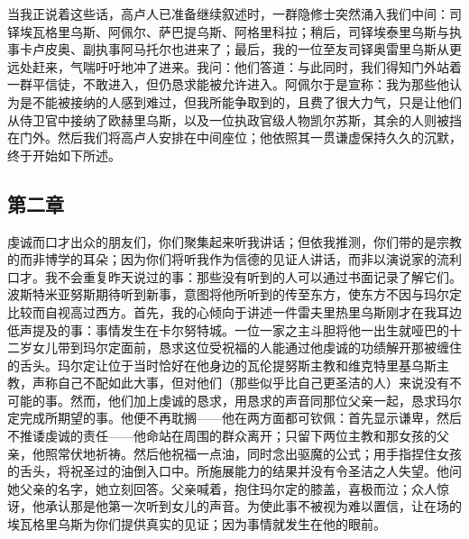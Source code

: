 当我正说着这些话，高卢人已准备继续叙述时，一群隐修士突然涌入我们中间：司铎埃瓦格里乌斯、阿佩尔、萨巴提乌斯、阿格里科拉；稍后，司铎埃泰里乌斯与执事卡卢皮奥、副执事阿马托尔也进来了；最后，我的一位至友司铎奥雷里乌斯从更远处赶来，气喘吁吁地冲了进来。我问：他们答道：与此同时，我们得知门外站着一群平信徒，不敢进入，但仍恳求能被允许进入。阿佩尔于是宣称：我为那些他认为是不能被接纳的人感到难过，但我所能争取到的，且费了很大力气，只是让他们从侍卫官中接纳了欧赫里乌斯，以及一位执政官级人物凯尔苏斯，其余的人则被挡在门外。然后我们将高卢人安排在中间座位；他依照其一贯谦虚保持久久的沉默，终于开始如下所述。\par


\subsection{第二章}

虔诚而口才出众的朋友们，你们聚集起来听我讲话；但依我推测，你们带的是宗教的而非博学的耳朵；因为你们将听我作为信德的见证人讲话，而非以演说家的流利口才。我不会重复昨天说过的事：那些没有听到的人可以通过书面记录了解它们。波斯特米亚努斯期待听到新事，意图将他所听到的传至东方，使东方不因与玛尔定比较而自视高过西方。首先，我的心倾向于讲述一件雷夫里热里乌斯刚才在我耳边低声提及的事：事情发生在卡尔努特城。一位一家之主斗胆将他一出生就哑巴的十二岁女儿带到玛尔定面前，恳求这位受祝福的人能通过他虔诚的功绩解开那被缠住的舌头。玛尔定让位于当时恰好在他身边的瓦伦提努斯主教和维克特里基乌斯主教，声称自己不配如此大事，但对他们（那些似乎比自己更圣洁的人）来说没有不可能的事。然而，他们加上虔诚的恳求，用恳求的声音同那位父亲一起，恳求玛尔定完成所期望的事。他便不再耽搁——他在两方面都可钦佩：首先显示谦卑，然后不推诿虔诚的责任——他命站在周围的群众离开；只留下两位主教和那女孩的父亲，他照常伏地祈祷。然后他祝福一点油，同时念出驱魔的公式；用手指捏住女孩的舌头，将祝圣过的油倒入口中。所施展能力的结果并没有令圣洁之人失望。他问她父亲的名字，她立刻回答。父亲喊着，抱住玛尔定的膝盖，喜极而泣；众人惊讶，他承认那是他第一次听到女儿的声音。为使此事不被视为难以置信，让在场的埃瓦格里乌斯为你们提供真实的见证；因为事情就发生在他的眼前。\par

